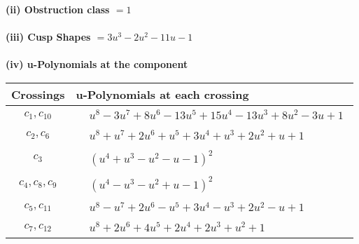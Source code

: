 \documentclass[1p]{elsarticle_modified}
\theoremstyle{definition}
\begin{document}
\flushleft \textbf{(ii) Obstruction class $= 1$}\\~\\
\flushleft \textbf{(iii) Cusp Shapes $= 3 u^3-2 u^2-11 u-1$}\\~\\
\newpage\renewcommand{\arraystretch}{1}
\flushleft \textbf{(iv) u-Polynomials at the component}\newline \\
\begin{tabular}{m{50pt}|m{274pt}}
Crossings & \hspace{64pt}u-Polynomials at each crossing \\
\hline $$\begin{aligned}c_{1},c_{10}\end{aligned}$$&$\begin{aligned}
&u^8-3 u^7+8 u^6-13 u^5+15 u^4-13 u^3+8 u^2-3 u+1
\end{aligned}$\\
\hline $$\begin{aligned}c_{2},c_{6}\end{aligned}$$&$\begin{aligned}
&u^8+u^7+2 u^6+u^5+3 u^4+u^3+2 u^2+u+1
\end{aligned}$\\
\hline $$\begin{aligned}c_{3}\end{aligned}$$&$\begin{aligned}
&(u^4+u^3- u^2- u-1)^2
\end{aligned}$\\
\hline $$\begin{aligned}c_{4},c_{8},c_{9}\end{aligned}$$&$\begin{aligned}
&(u^4- u^3- u^2+u-1)^2
\end{aligned}$\\
\hline $$\begin{aligned}c_{5},c_{11}\end{aligned}$$&$\begin{aligned}
&u^8- u^7+2 u^6- u^5+3 u^4- u^3+2 u^2- u+1
\end{aligned}$\\
\hline $$\begin{aligned}c_{7},c_{12}\end{aligned}$$&$\begin{aligned}
&u^8+2 u^6+4 u^5+2 u^4+2 u^3+u^2+1
\end{aligned}$\\
\hline
\end{tabular}\\~\\
\end{document}
